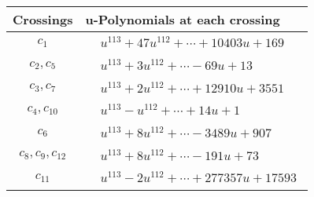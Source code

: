 \documentclass[1p]{elsarticle_modified}
\theoremstyle{definition}
\begin{document}
\begin{tabular}{m{50pt}|m{274pt}}
Crossings & \hspace{64pt}u-Polynomials at each crossing \\
\hline $$\begin{aligned}c_{1}\end{aligned}$$&$\begin{aligned}
&u^{113}+47 u^{112}+\cdots+10403 u+169
\end{aligned}$\\
\hline $$\begin{aligned}c_{2},c_{5}\end{aligned}$$&$\begin{aligned}
&u^{113}+3 u^{112}+\cdots-69 u+13
\end{aligned}$\\
\hline $$\begin{aligned}c_{3},c_{7}\end{aligned}$$&$\begin{aligned}
&u^{113}+2 u^{112}+\cdots+12910 u+3551
\end{aligned}$\\
\hline $$\begin{aligned}c_{4},c_{10}\end{aligned}$$&$\begin{aligned}
&u^{113}- u^{112}+\cdots+14 u+1
\end{aligned}$\\
\hline $$\begin{aligned}c_{6}\end{aligned}$$&$\begin{aligned}
&u^{113}+8 u^{112}+\cdots-3489 u+907
\end{aligned}$\\
\hline $$\begin{aligned}c_{8},c_{9},c_{12}\end{aligned}$$&$\begin{aligned}
&u^{113}+8 u^{112}+\cdots-191 u+73
\end{aligned}$\\
\hline $$\begin{aligned}c_{11}\end{aligned}$$&$\begin{aligned}
&u^{113}-2 u^{112}+\cdots+277357 u+17593
\end{aligned}$\\
\hline
\end{tabular}\\~\\
\end{document}
